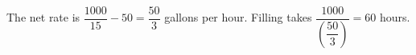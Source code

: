 The net rate is $\dfrac{1000}{15}-50=\dfrac{50}{3}$ gallons per hour. Filling takes $\dfrac{1000}{(\dfrac{50}{3})}=\boxed{60}$ hours.
